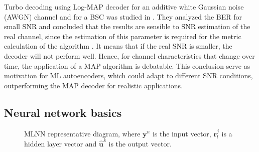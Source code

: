 \documentclass[conference]{IEEEtran}
\begin{document}
Turbo decoding using Log-MAP decoder for an additive white Gaussian noise (AWGN) channel and for a BSC was studied in \cite{JordanMA}. They analyzed the BER for small SNR and concluded that the results are sensible to SNR estimation of the real channel, since the estimation of this parameter is required for the metric calculation of the algorithm \cite{journals/ett/RobertsonHV97}. It means that if the real SNR is smaller, the decoder will not perform well. Hence, for channel characteristics that change over time, the application of a MAP algorithm is debatable. This conclusion serve as motivation for ML autoencoders, which could adapt to different SNR conditions, outperforming the MAP decoder for realistic applications.

\subsection{Neural network basics}


\begin{figure}[!hbp]
\centering


\caption{MLNN representative diagram, where $\textbf{y}^n$ is the input vector, $\textbf{r}_{l}^{j}$ is a hidden layer vector
and $\hat{\textbf{u}}^{k}$ is the output vector.} \label{fig:NN}
\end{figure}
\end{document}
